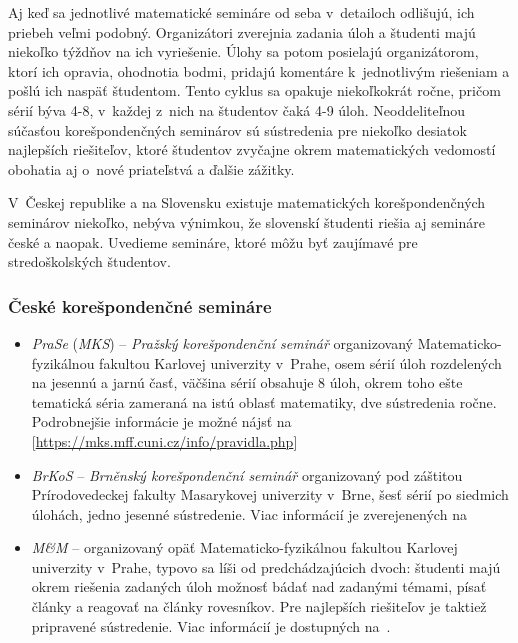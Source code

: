 Aj keď sa jednotlivé matematické semináre od seba v~detailoch odlišujú, ich priebeh veľmi podobný. Organizátori zverejnia zadania úloh a študenti majú niekoľko týždňov na ich vyriešenie. Úlohy sa potom posielajú organizátorom, ktorí ich opravia, ohodnotia bodmi, pridajú komentáre k~jednotlivým riešeniam a pošlú ich naspäť študentom. Tento cyklus sa opakuje niekoľkokrát ročne, pričom sérií býva 4-8, v~každej z~nich na študentov čaká 4-9 úloh. Neoddeliteľnou súčasťou korešpondenčných seminárov sú sústredenia pre niekoľko desiatok najlepších riešiteľov, ktoré študentov zvyčajne okrem matematických vedomostí obohatia aj o~nové priateľstvá a ďalšie zážitky.

V~Českej republike a na Slovensku existuje matematických korešpondenčných seminárov niekoľko, nebýva výnimkou, že slovenskí študenti riešia aj semináre české a naopak. Uvedieme semináre, ktoré môžu byť zaujímavé pre stredoškolských študentov.

\subsubsection{České korešpondenčné semináre}
\begin{itemize}
\item \textit{PraSe} (\textit{MKS}) -- \textit{Pražský korešpondenční seminář} organizovaný Matematicko-fyzikálnou fakultou  Karlovej univerzity v~Prahe, osem sérií úloh rozdelených na jesennú a jarnú časť, väčšina sérií obsahuje 8 úloh, okrem toho ešte tematická séria zameraná na istú oblasť matematiky, dve sústredenia ročne. Podrobnejšie informácie je možné nájsť na [\url{https://mks.mff.cuni.cz/info/pravidla.php}]
\item \textit{BrKoS} -- \textit{Brněnský korešpondenční seminář} organizovaný pod záštitou Prírodovedeckej fakulty Masarykovej univerzity v~Brne, šesť sérií po siedmich úlohách, jedno jesenné sústredenie. Viac informácií je zverejenených na \cite{brkos}
\item \textit{M\&M} -- organizovaný opäť Matematicko-fyzikálnou fakultou Karlovej univerzity v~Prahe, typovo sa líši od predchádzajúcich dvoch: študenti majú okrem riešenia zadaných úloh možnosť bádať nad zadanými témami, písať články a reagovať na články rovesníkov. Pre najlepších riešiteľov je taktiež pripravené sústredenie. Viac informácií je dostupných na~\cite{mam}.
\end{itemize}

